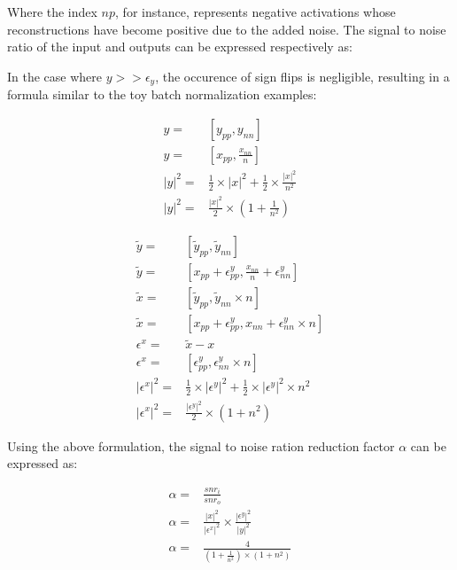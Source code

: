 \documentclass[twocolumn]{bmcart}
\begin{document}
Where the index $np$, for instance, represents negative activations whose reconstructions have become positive due to the added noise. 
The signal to noise ratio of the input and outputs can be expressed respectively as:

In the case where $y >> \epsilon_y$, the occurence of sign flips is negligible, 
resulting in a formula similar to the toy batch normalization examples:

\begin{subequations}
\begin{align}
 y =& [y_{pp}, y_{nn}] \\
 y =& [x_{pp}, \frac{x_{nn}}{n}] \\
 |y|^2 =& \frac{1}{2} \times |x|^2 + \frac{1}{2} \times \frac{|x|^2}{n^2} \\
 |y|^2 =&\frac{|x|^2}{2} \times (1+\frac{1}{n^2})
\end{align}
\end{subequations}

\begin{subequations}
\begin{align}
\tilde{y}       =& [ \tilde{y}_{pp}, \tilde{y}_{nn}] \\
\tilde{y}       =& [ x_{pp} + \epsilon_{pp}^y, \frac{x_{nn}}{n} + \epsilon_{nn}^y ] \\
\tilde{x}       =& [ \tilde{y}_{pp}, \tilde{y}_{nn} \times n] \\
\tilde{x}       =& [ x_{pp} + \epsilon_{pp}^y, x_{nn} + \epsilon_{nn}^y \times n  ]\\
\epsilon^x      =& \tilde{x} - x\\
\epsilon^x      =& [ \epsilon_{pp}^y, \epsilon_{nn}^y \times n ]\\
|\epsilon^x|^2  =& \frac{1}{2} \times |\epsilon^y|^2 + \frac{1}{2} \times |\epsilon^y|^2 \times n^2 \\
|\epsilon^x|^2  =& \frac{|\epsilon^y|^2}{2} \times (1 + n^2)
\end{align}
\end{subequations}

Using the above formulation, the signal to noise ration reduction factor $\alpha$ can be expressed as:

\begin{subequations}
\begin{align}
\alpha =& \frac{snr_i}{snr_o} \\
\alpha =& \frac{|x|^2}{|\epsilon^x|^2} \times  \frac{|\epsilon^y|^2}{|y|^2} \\
\alpha =& \frac{4}{(1+\frac{1}{n^2}) \times (1 + n^2)}
\end{align}
\end{subequations}
\end{document}
